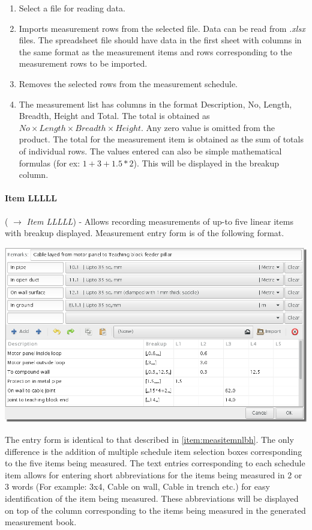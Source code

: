 \documentclass[twoside,a4paper]{refart}
\begin{document}
\begin{enumerate}
	 	\item Select a file for reading data.
	 	\item Imports measurement rows from the selected file. Data can be read from \emph{.xlsx} files. The spreadsheet file should have data in the first sheet with columns in the same format as the measurement items and rows corresponding to the measurement rows to be imported.\\
	 	\item Removes the selected rows from the measurement schedule.
	 	\item The measurement list has columns in the format Description, No, Length, Breadth, Height and Total. The total is obtained as $No \times Length \times Breadth \times Height$. Any zero value is omitted from the product. The total for the measurement item is obtained as the sum of totals of individual rows. The values entered can also be simple mathematical formulas (for ex: $1+3+1.5*2$). This will be displayed in the breakup column.
	 \end{enumerate}
	 
	 \paragraph{Item LLLLL} (\fbox{\emph{$+$}} $\rightarrow$ \emph{Item LLLLL}) - Allows recording measurements of up-to five linear items with breakup displayed. Measurement entry form is of the following format.
	 
	 \begin{maxipage}
	 	\includegraphics[width=1\linewidth]{screenshots/window_lllll.png}
	 \end{maxipage}
	 
	 The entry form is identical to that described in \ref{item:measitemnlbh}. The only difference is the addition of multiple schedule item selection boxes corresponding to the five items being measured. The text entries corresponding to each schedule item allows for entering short abbreviations for the items being measured in 2 or 3 words (For example: 3x4, Cable on wall, Cable in trench etc.) for easy identification of the item being measured. These abbreviations will be displayed on top of the column corresponding to the items being measured in the generated measurement book.
	 
\end{document}
